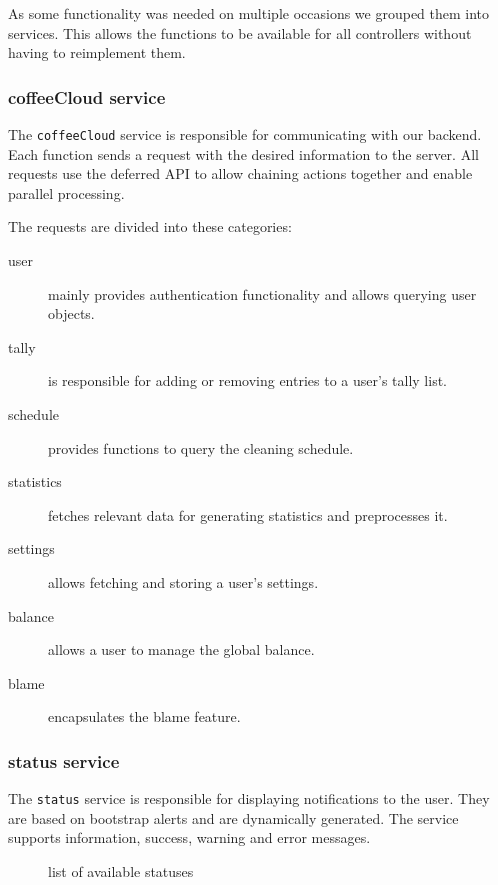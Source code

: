 As some functionality was needed on multiple occasions we grouped them
into services. This allows the functions to be available for all
controllers without having to reimplement them.

\subsubsection{coffeeCloud service}\label{coffeecloud-service}

The \texttt{coffeeCloud} service is responsible for communicating with
our backend. Each function sends a request with the desired information
to the server. All requests use the deferred API to allow chaining
actions together and enable parallel processing.

The requests are divided into these categories:

\begin{description}
\item[user] mainly provides authentication functionality and allows
querying user objects.

\item[tally] is responsible for adding or removing entries to a user's
tally list.

\item[schedule] provides functions to query the cleaning schedule.

\item[statistics] fetches relevant data for generating statistics and
preprocesses it.

\item[settings] allows fetching and storing a user's settings.

\item[balance] allows a user to manage the global balance.

\item[blame] encapsulates the blame feature.
\end{description}

\subsubsection{status service}\label{status-service}

The \texttt{status} service is responsible for displaying notifications
to the user. They are based on bootstrap alerts and are dynamically
generated. The service supports information, success, warning and error
messages.

\begin{figure}[htbp]
\centering
{}
\caption{list of available statuses}
\end{figure}

